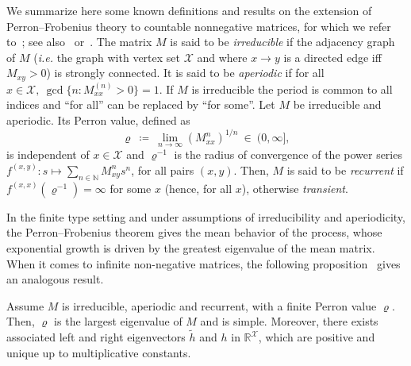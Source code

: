 \begin{refsegment}
We summarize here some known definitions and results on the extension of Perron--Frobenius theory to countable nonnegative matrices, for which we refer to~\citet[Chapter~7, Section~1]{kitchens_symbolic_1998}; see also~\citet[Chapter~6]{seneta_non-negative_1981} or~\citet{vere-jones_ergodic_1967}.
The matrix $M$ is said to be \textit{irreducible} if the adjacency graph of $M$ (\textit{i.e.} the graph with vertex set $\mathcal{X}$ and where $x\to y$ is a directed edge iff $M_{xy}>0$) is strongly connected.
It is said to be \textit{aperiodic} if for all $x\in\mathcal{X},\
\gcd\{n :  M^{(n)}_{xx}>0\}=1$.
If $M$ is irreducible the period is common to all indices and ``for all'' can be replaced by ``for some''.
Let $M$ be irreducible and aperiodic.
Its Perron value, defined as 
\begin{equation}\label{eq:rho}
  \varrho\ \coloneqq\ \lim_{n\to\infty}(M^n_{xx})^{1/n}\ \in\ (0,\infty], 
\end{equation}
  is independent of $x\in\mathcal{X}$ and $\varrho^{-1}$ is the radius of convergence of the power series $f^{(x,y)}:s\mapsto\sum_{n\in \mathbb{N}} M^{n}_{xy}s^n$, for all pairs $(x,y)$.
Then, $M$ is said to be \textit{recurrent} if $f^{(x,x)}(\varrho^{-1})=\infty$ for some $x$ (hence, for all $x$), otherwise \textit{transient}.

In the finite type setting and under assumptions of irreducibility and aperiodicity, the Perron--Frobenius theorem gives the mean behavior of the process, whose exponential growth is driven by the greatest eigenvalue of the mean matrix.
When it comes to infinite non-negative matrices, the following proposition~\citep[Theorem~7.1.3]{kitchens_symbolic_1998} gives an analogous result.

\begin{prop}\label{prop:perron_frobenius}
  Assume $M$ is irreducible, aperiodic and recurrent, with a finite Perron value $\varrho$. 
  Then, $\varrho$ is the largest eigenvalue of $M$ and is simple. Moreover, there exists associated left and right eigenvectors $\tilde{h}$ and $h$ in $\mathbb{R}^{\mathcal{X}}$, which are positive and unique up to multiplicative constants.


\end{prop}
\end{refsegment}

